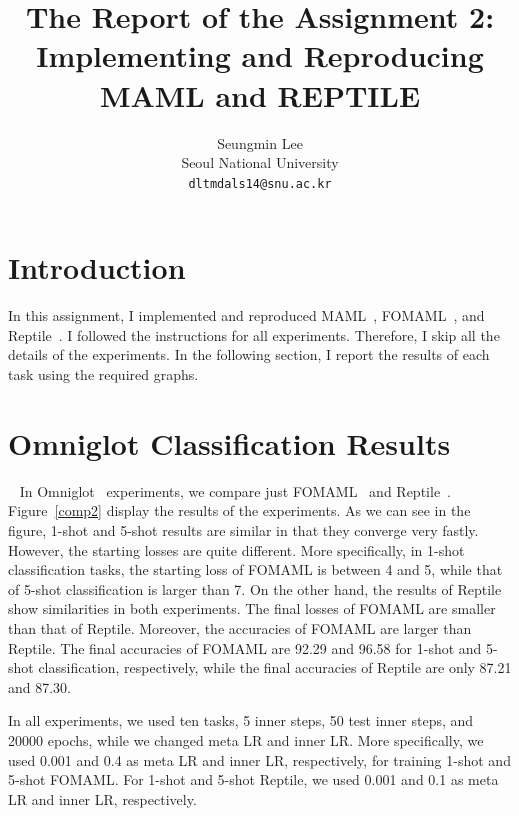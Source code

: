\documentclass[final]{cvpr}
\begin{document}
\title{The Report of the Assignment 2:\\Implementing and Reproducing MAML and REPTILE}

\author{Seungmin Lee\\
Seoul National University\\
{\tt\small dltmdals14@snu.ac.kr}
}

\onecolumn
\maketitle


\section{Introduction}
In this assignment, I implemented and reproduced MAML~\cite{maml}, FOMAML~\cite{maml}, and Reptile~\cite{reptile}. I followed the instructions for all experiments. Therefore, I skip all the details of the experiments. In the following section, I report the results of each task using the required graphs.

\section{Omniglot Classification Results}~\label{omniglot}
In Omniglot~\cite{omniglot} experiments, we compare just FOMAML~\cite{maml} and Reptile~\cite{reptile}. Figure~\ref{comp2} display the results of the experiments. As we can see in the figure, 1-shot and 5-shot results are similar in that they converge very fastly. However, the starting losses are quite different. More specifically, in 1-shot classification tasks, the starting loss of FOMAML is between 4 and 5, while that of 5-shot classification is larger than 7. On the other hand, the results of Reptile show similarities in both experiments. The final losses of FOMAML are smaller than that of Reptile. Moreover, the accuracies of FOMAML are larger than Reptile. The final accuracies of FOMAML are 92.29 and 96.58 for 1-shot and 5-shot classification, respectively, while the final accuracies of Reptile are only 87.21 and 87.30.

In all experiments, we used ten tasks, 5 inner steps, 50 test inner steps, and 20000 epochs, while we changed meta LR and inner LR. More specifically, we used 0.001 and 0.4 as meta LR and inner LR, respectively, for training 1-shot and 5-shot FOMAML. For 1-shot and 5-shot Reptile, we used 0.001 and 0.1 as meta LR and inner LR, respectively.
\end{document}
